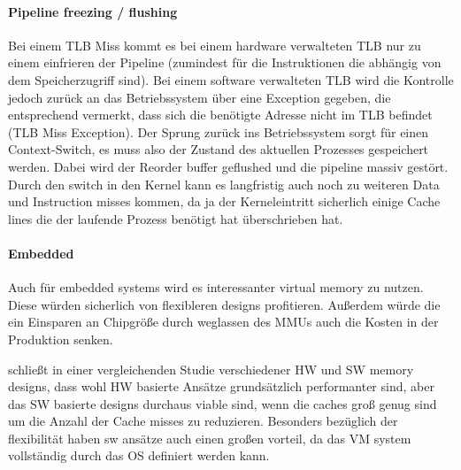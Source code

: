 \paragraph{Pipeline freezing / flushing} Bei einem TLB Miss  kommt es bei
einem hardware verwalteten TLB nur zu einem einfrieren der Pipeline (zumindest für die Instruktionen
die abhängig von dem Speicherzugriff sind). Bei einem software verwalteten TLB wird die Kontrolle
jedoch zurück an das Betriebssystem über eine Exception gegeben, die entsprechend vermerkt,
dass sich die benötigte Adresse nicht im TLB befindet (TLB Miss Exception).
Der Sprung zurück ins Betriebssystem sorgt für einen Context-Switch, es muss also der Zustand
des aktuellen Prozesses gespeichert werden. Dabei wird der Reorder buffer geflushed und die
pipeline massiv gestört. Durch den switch in den Kernel kann es langfristig auch noch zu weiteren
Data und Instruction misses kommen, da ja der Kerneleintritt sicherlich einige Cache lines die der
laufende Prozess benötigt hat überschrieben hat. 

\paragraph{Embedded} Auch für embedded systems wird es interessanter virtual memory zu nutzen.
Diese würden sicherlich von flexibleren designs profitieren. Außerdem würde die ein Einsparen
an Chipgröße durch weglassen des MMUs auch die Kosten in der Produktion senken. \cite{jacob1998look}


\cite{jacob1998look} schließt in einer vergleichenden Studie verschiedener HW und SW memory designs,
dass wohl HW basierte Ansätze grundsätzlich performanter sind, aber das SW basierte designs durchaus
viable sind, wenn die caches groß genug sind um die Anzahl der Cache misses zu reduzieren.
Besonders bezüglich der flexibilität haben sw ansätze auch einen großen vorteil, da das VM system
vollständig durch das OS definiert werden kann.



